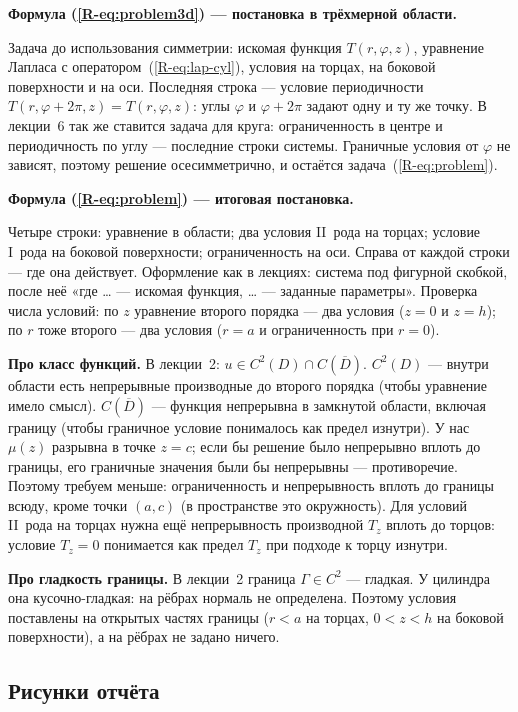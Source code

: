 \documentclass[a4paper,12pt]{article}
\newcommand{\rf}[1]{(\ref*{R-#1})}
\newcommand{\fhead}[2]{\par\medskip\textbf{Формула #1 — #2.}\par\nopagebreak[4]}
\begin{document}
\fhead{\rf{eq:problem3d}}{постановка в трёхмерной области}
Задача до использования симметрии: искомая функция $T(r,\varphi,z)$,
уравнение Лапласа с оператором~\rf{eq:lap-cyl}, условия на торцах, на
боковой поверхности и на оси. Последняя строка — условие периодичности
$T(r,\varphi+2\pi,z)=T(r,\varphi,z)$: углы $\varphi$ и $\varphi+2\pi$ задают
одну и ту же точку. В лекции~6 так же ставится задача для круга:
ограниченность в центре и периодичность по углу — последние строки системы.
Граничные условия от $\varphi$ не зависят, поэтому решение осесимметрично,
и остаётся задача~\rf{eq:problem}.

\fhead{\rf{eq:problem}}{итоговая постановка}
Четыре строки: уравнение в области; два условия II~рода на торцах; условие
I~рода на боковой поверхности; ограниченность на оси. Справа от каждой
строки — где она действует. Оформление как в лекциях: система под фигурной
скобкой, после неё «где … — искомая функция, … — заданные параметры».
Проверка числа условий: по $z$ уравнение второго порядка — два условия
($z=0$ и $z=h$); по $r$ тоже второго — два условия ($r=a$ и ограниченность
при $r=0$).

\textbf{Про класс функций.} В лекции~2: $u\in C^2(D)\cap C(\overline D)$.
$C^2(D)$ — внутри области есть непрерывные производные до второго порядка
(чтобы уравнение имело смысл). $C(\overline D)$ — функция непрерывна
в замкнутой области, включая границу (чтобы граничное условие понималось как
предел изнутри). У нас $\mu(z)$ разрывна в точке $z=c$; если бы решение было
непрерывно вплоть до границы, его граничные значения были бы непрерывны —
противоречие. Поэтому требуем меньше: ограниченность и непрерывность вплоть
до границы всюду, кроме точки $(a,c)$ (в пространстве это окружность).
Для условий II~рода на торцах нужна ещё непрерывность производной $T_z$
вплоть до торцов: условие $T_z=0$ понимается как предел $T_z$ при подходе
к торцу изнутри.

\textbf{Про гладкость границы.} В лекции~2 граница $\Gamma\in C^2$ —
гладкая. У цилиндра она кусочно-гладкая: на рёбрах нормаль не определена.
Поэтому условия поставлены на открытых частях границы ($r<a$ на торцах,
$0<z<h$ на боковой поверхности), а на рёбрах не задано ничего.

\subsection{Рисунки отчёта}
\end{document}
